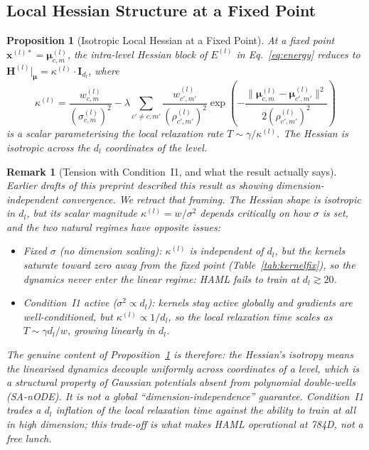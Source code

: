 \documentclass[11pt,a4paper]{article}
\newtheorem{proposition}[theorem]{Proposition}
\newtheorem{remark}[theorem]{Remark}
\begin{document}
\subsection{Local Hessian Structure at a Fixed Point}
\label{sec:theory:dimindep}

\begin{proposition}[Isotropic Local Hessian at a Fixed Point]
\label{prop:dimindep}
At a fixed point $\mathbf{x}^{(l)*} = \boldsymbol{\mu}^{(l)}_{c,m}$, the intra-level
Hessian block of $E^{(l)}$ in Eq.~\ref{eq:energy} reduces to
$\mathbf{H}^{(l)}\big|_{\boldsymbol{\mu}} = \kappa^{(l)} \cdot \mathbf{I}_{d_l}$,
where
\[
\kappa^{(l)} = \frac{w^{(l)}_{c,m}}{(\sigma^{(l)}_{c,m})^2}
  - \lambda \sum_{c' \ne c, m'} \frac{w^{(l)}_{c',m'}}{(\rho^{(l)}_{c',m'})^2}
    \exp\!\left(-\frac{\|\boldsymbol{\mu}^{(l)}_{c,m} - \boldsymbol{\mu}^{(l)}_{c',m'}\|^2}{2(\rho^{(l)}_{c',m'})^2}\right)
\]
is a scalar parameterising the local relaxation rate $T \sim \gamma/\kappa^{(l)}$. The
Hessian is isotropic across the $d_l$ coordinates of the level.
\end{proposition}

\begin{remark}[Tension with Condition~I1, and what the result actually says]
\label{rem:dimindep_tension}
Earlier drafts of this preprint described this result as showing
\emph{dimension-independent convergence}. We retract that framing. The Hessian shape is
isotropic in $d_l$, but its scalar magnitude $\kappa^{(l)} = w/\sigma^2$ depends
critically on how $\sigma$ is set, and the two natural regimes have opposite issues:

\begin{itemize}
  \item \emph{Fixed $\sigma$} (no dimension scaling): $\kappa^{(l)}$ is independent
        of $d_l$, but the kernels saturate toward zero away from the fixed point
        (Table~\ref{tab:kernelfix}), so the dynamics never enter the linear regime:
        HAML fails to train at $d_l \gtrsim 20$.
  \item \emph{Condition~I1 active} ($\sigma^2 \propto d_l$): kernels stay active
        globally and gradients are well-conditioned, but $\kappa^{(l)} \propto 1/d_l$,
        so the local relaxation time scales as $T \sim \gamma d_l / w$, growing
        \emph{linearly} in $d_l$.
\end{itemize}

The genuine content of Proposition~\ref{prop:dimindep} is therefore: the Hessian's
isotropy means the linearised dynamics decouple uniformly across coordinates of a
level, which is a structural property of Gaussian potentials absent from polynomial
double-wells (SA-nODE). It is \emph{not} a global ``dimension-independence''
guarantee. Condition~I1 trades a $d_l$ inflation of the local relaxation time against
the ability to train at all in high dimension; this trade-off is what makes HAML
operational at 784D, not a free lunch.
\end{remark}
\end{document}
